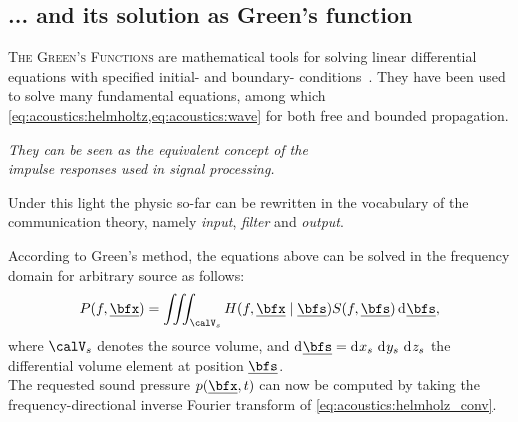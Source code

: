 \subsection{... and its solution as Green's function}
\textsc{The Green's Functions} are mathematical tools for solving linear differential equations with specified initial- and boundary- conditions~\cite{duffy2015green}.
They have been used to solve many fundamental equations, among which \cref{eq:acoustics:helmholtz,eq:acoustics:wave} for both free and bounded propagation.
\begin{center}
    \textit{
    They can be seen as the equivalent concept of the
    \\ \emph{impulse responses
    }
    used in signal processing.}
\end{center}
Under this light the physic so-far can be rewritten in the vocabulary of the communication theory, namely \textit{input}, \textit{filter} and \textit{output}.

According to Green's method, the equations above can be solved in the frequency domain for arbitrary source as follows:
\begin{equation}
    \label{eq:acoustics:helmholz_conv}
    P(f, \positionMicrophone) = \iiint_{\volume_\contSource} H(f, \positionMicrophone \mid \positionSource) S(f, \positionSource) \kdiff\positionSource
    ,
\end{equation}
where $\volume_\contSource$ denotes the source volume,
and  $\kdiff\positionSource =  \kdiff{x_\contSource}\,\kdiff{y_\contSource}\,\kdiff{z_\contSource}$ the  differential  volume element at position $\positionSource$.
\\The requested sound pressure $\pressureSpaceTime$ can now be computed by taking the frequency-directional inverse Fourier transform of \cref{eq:acoustics:helmholz_conv}.

